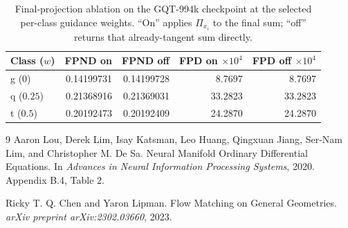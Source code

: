 \documentclass[10pt]{article}
\begin{document}
\begin{table}[H]
\centering
\caption{Final-projection ablation on the GQT-994k checkpoint at the selected per-class
guidance weights. ``On'' applies $\Pi_{x_i}$ to the final sum; ``off'' returns that
already-tangent sum directly.}
\label{tab:projection-ablation}
\small
\begin{tabular}{lrrrr}
\toprule
Class ($w$) & FPND on & FPND off & FPD on $\times10^4$ & FPD off $\times10^4$ \\
\midrule
g ($0$)    & 0.14199731 & 0.14199728 & 8.7697 & 8.7697 \\
q ($0.25$) & 0.21368916 & 0.21369031 & 33.2823 & 33.2823 \\
t ($0.5$)  & 0.20192473 & 0.20192409 & 24.2870 & 24.2870 \\
\bottomrule
\end{tabular}
\end{table}

\begin{thebibliography}{9}
Aaron Lou, Derek Lim, Isay Katsman, Leo Huang, Qingxuan Jiang, Ser-Nam Lim, and
Christopher M. De Sa.
\newblock Neural Manifold Ordinary Differential Equations.
\newblock In \emph{Advances in Neural Information Processing Systems}, 2020.
\newblock Appendix B.4, Table 2.

Ricky T. Q. Chen and Yaron Lipman.
\newblock Flow Matching on General Geometries.
\newblock \emph{arXiv preprint arXiv:2302.03660}, 2023.
\end{thebibliography}
\end{document}
